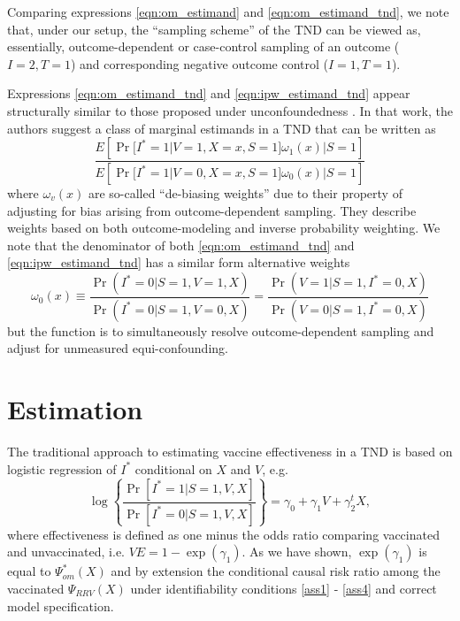 \documentclass[11pt]{article}
\begin{document}
 \begin{remark}
     Comparing expressions \ref{eqn:om_estimand} and \ref{eqn:om_estimand_tnd}, we note that, under our setup, the ``sampling scheme'' of the TND can be viewed as, essentially, outcome-dependent or case-control sampling of an outcome ($I=2, T=1$) and corresponding negative outcome control ($I=1, T =1$). 
 \end{remark}

 \begin{remark}
     Expressions \ref{eqn:om_estimand_tnd} and  \ref{eqn:ipw_estimand_tnd} appear structurally similar to those proposed under unconfoundedness \cite{jiang}. In that work, the authors suggest a class of marginal estimands in a TND that can be written as 
     \begin{equation*}
         \dfrac{E\left[\Pr[I^* = 1 | V = 1, X = x, S = 1]\omega_1(x) | S = 1 \right]}{E\left[\Pr[I^* = 1 | V = 0, X = x, S = 1]\omega_0(x) | S = 1\right]}
     \end{equation*}
     where $\omega_v(x)$ are so-called ``de-biasing weights'' due to their property of adjusting for bias arising from outcome-dependent sampling. They describe weights based on both outcome-modeling and inverse probability weighting. We note that the denominator of both \ref{eqn:om_estimand_tnd} and  \ref{eqn:ipw_estimand_tnd} has a similar form alternative weights 
     \begin{equation*}
         \omega_0(x) \equiv \dfrac{\Pr(I^* = 0 | S = 1, V = 1, X)}{\Pr(I^* = 0| S = 1, V = 0, X)} = \dfrac{\Pr(V=1 | S = 1, I^* = 0, X)}{\Pr(V=0| S = 1, I^* = 0, X)}
     \end{equation*}
     but the function is to simultaneously resolve outcome-dependent sampling and adjust for unmeasured equi-confounding. 
 \end{remark}

\section{Estimation}\label{sec:estimation}
The traditional approach to estimating vaccine effectiveness in a TND is based on logistic regression of $I^*$ conditional on $X$ and $V$, e.g.
$$\log \left\{\dfrac{\Pr[I^* = 1 | S = 1, V, X]}{\Pr[I^* = 0 | S = 1, V, X]}\right\} = \gamma_0 + \gamma_1 V + \gamma_2^t X,$$
where effectiveness is defined as one minus the odds ratio comparing vaccinated and unvaccinated, i.e. $VE = 1 - \exp(\gamma_1)$. As we have shown, $ \exp(\gamma_1)$ is equal to $\Psi^*_{om}(X)$ and by extension the conditional causal risk ratio among the vaccinated $\Psi_{RRV}(X)$ under identifiability conditions \ref{ass1} - \ref{ass4} and correct model specification. 
\end{document}
